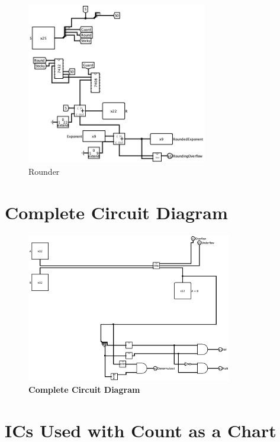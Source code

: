 \documentclass{article}
\begin{document}
\begin{figure}[h]
    \centering 
    \includegraphics[width = 0.7\textwidth]{rounder}
    \caption{Rounder}
\end{figure}
\pagebreak 
\section{Complete Circuit Diagram} 
\begin{figure}[h]
    \vspace{4cm}
    \centering
    \includegraphics[width = 0.8\textwidth]{full_circuit}
    \caption{\textbf{Complete Circuit Diagram}}
\end{figure}
\pagebreak
\section{ ICs Used with Count as a Chart}
\end{document}
